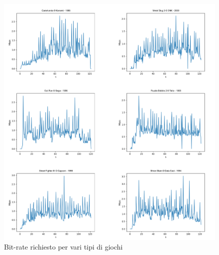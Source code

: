 \begin{figure}
	\includegraphics[width=\linewidth]{immagini/bandwith}
	\caption{Bit-rate richiesto per vari tipi di giochi}	
	\label{fig:bandwith}
\end{figure}